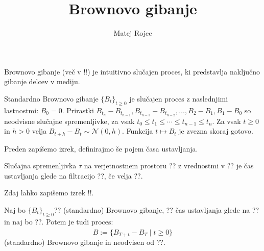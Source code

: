 \documentclass[11pt]{article}
\title{Brownovo gibanje}
\date{}
\author{Matej Rojec}
\begin{document}
Brownovo gibanje (več v !!) je intuitivno slučajen proces, %
ki predstavlja naključno gibanje delcev v mediju.
    

    Standardno Brownovo gibanje $\{B_t\}_{t \geq 0}$ je slučajen proces z naslednjimi lastnostmi: 
        $B_0 = 0$.
        Prirastki $B_{t_n} - B_{t_{n-1}}, B_{t_{n-1}} - B_{t_{n-2}}, \ldots, B_2 - B_1, B_1 - B_0$ so neodvisne slučajne spremenljivke, za vsak $t_0 \leq t_1 \leq \cdots \leq t_{n-1} \leq t_n$.
        Za vsak $t \geq 0$ in $h > 0$ velja $B_{t+h} - B_t \sim \mathcal{N}(0, h)$.
        Funkcija $t \mapsto B_t$ je zvezna skoraj gotovo.
    
    Preden zapišemo izrek, definirajmo še pojem časa ustavljanja.
    
    Slučajna spremenljivka $\tau$ na verjetnostnem prostoru ?? z vrednostmi v ??
    je čas ustavljanja glede na filtracijo ??, če velja ??.
    
    Zdaj lahko zapišemo izrek !!. %
    
    Naj bo $\{B_t\}_{t \geq 0}$?? (standardno) Brownovo gibanje, ?? čas ustavljanja glede na 
    ?? in naj bo ??.
    Potem je tudi proces:
    \[
    \hat{B} := \{B_{T+t} - B_T \mid t \geq 0\}
    \]
    (standardno) Brownovo gibanje in neodvisen od ??.
    
\end{document}
